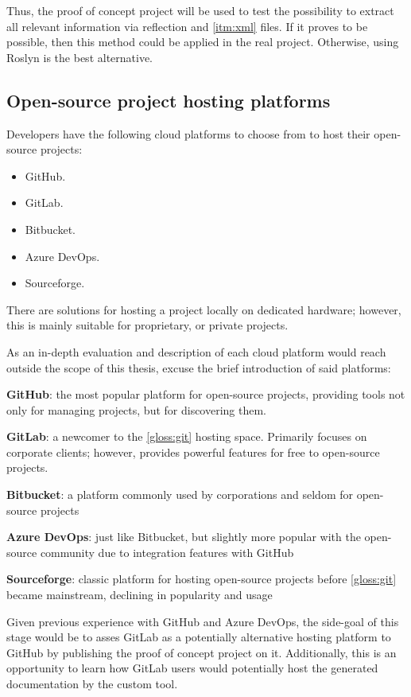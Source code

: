 Thus, the proof of concept project will be used to test the possibility to extract all relevant information via reflection and \ref{itm:xml} files. If it proves to be possible, then this method could be applied in the real project. Otherwise, using Roslyn is the best alternative.

\subsection{Open-source project hosting platforms}
Developers have the following cloud platforms to choose from to host their open-source projects:
\begin{itemize}
    \item GitHub.
    \item GitLab.
    \item Bitbucket.
    \item Azure DevOps.
    \item Sourceforge.
\end{itemize}

There are solutions for hosting a project locally on dedicated hardware; however, this is mainly suitable for proprietary, or private projects.

As an in-depth evaluation and description of each cloud platform would reach outside the scope of this thesis, excuse the brief introduction of said platforms:

\textbf{GitHub}: the most popular platform for open-source projects, providing tools not only for managing projects, but for discovering them.

\textbf{GitLab}: a newcomer to the \ref{gloss:git} hosting space. Primarily focuses on corporate clients; however, provides powerful features for free to open-source projects.

\textbf{Bitbucket}: a platform commonly used by corporations and seldom for open-source projects

\textbf{Azure DevOps}: just like Bitbucket, but slightly more popular with the open-source community due to integration features with GitHub

\textbf{Sourceforge}: classic platform for hosting open-source projects before \ref{gloss:git} became mainstream, declining in popularity and usage

Given previous experience with GitHub and Azure DevOps, the side-goal of this stage would be to asses GitLab as a potentially alternative hosting platform to GitHub by publishing the proof of concept project on it. Additionally, this is an opportunity to learn how GitLab users would potentially host the generated documentation by the custom tool.

